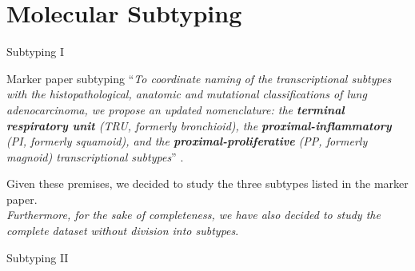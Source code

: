 \documentclass{beamer}
\begin{document}
\section{Molecular Subtyping}
\begin{frame}{Subtyping I}
  \begin{block}{Marker paper subtyping}
    ``\textit{To coordinate naming of the transcriptional subtypes with the
      histopathological, anatomic and mutational classifications of lung
      adenocarcinoma, we propose an updated nomenclature: the \textbf{terminal
        respiratory unit} (\emph{TRU}, formerly bronchioid), the
      \textbf{proximal-inflammatory} (\emph{PI}, formerly squamoid), and the
      \textbf{proximal-proliferative} (\emph{PP}, formerly magnoid)
      transcriptional subtypes}'' \cite{luadmarker}. 
  \end{block}
  \pause
  \begin{block}{}
    Given these premises, we decided to study the three subtypes listed in the
    marker paper.\\
    \textit{Furthermore, for the sake of completeness, we have also decided to
      study the complete dataset without division into subtypes}. 
  \end{block}
\end{frame}
\begin{frame}{Subtyping II}
\end{frame}
\end{document}
